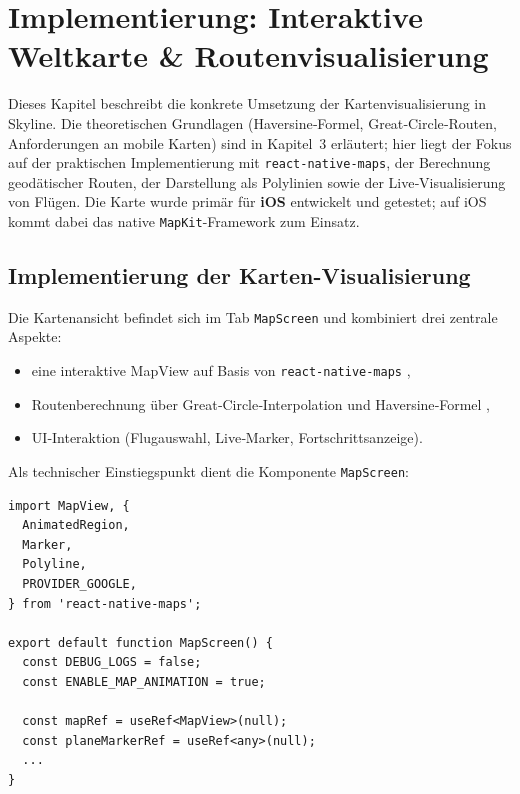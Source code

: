 \chapter{Implementierung: Interaktive Weltkarte \& Routenvisualisierung}\label{chapter:weltkarte}

Dieses Kapitel beschreibt die konkrete Umsetzung der Kartenvisualisierung in Skyline.
Die theoretischen Grundlagen (Haversine‑Formel, Great‑Circle‑Routen, Anforderungen an mobile Karten) sind in Kapitel~3 erläutert; hier liegt der Fokus auf der praktischen Implementierung mit \texttt{react-native-maps}, der Berechnung geodätischer Routen, der Darstellung als Polylinien sowie der Live‑Visualisierung von Flügen.
Die Karte wurde primär für \textbf{iOS} entwickelt und getestet; auf iOS kommt dabei das native \texttt{MapKit}-Framework zum Einsatz.

\section{Implementierung der Karten-Visualisierung}

Die Kartenansicht befindet sich im Tab \texttt{MapScreen} und kombiniert drei zentrale Aspekte:

\begin{itemize}
  \item eine interaktive MapView auf Basis von \texttt{react-native-maps} \cite{reactNativeMaps},
  \item Routenberechnung über Great‑Circle‑Interpolation und Haversine‑Formel \cite{movableTypeLatLong},
  \item UI‑Interaktion (Flugauswahl, Live‑Marker, Fortschrittsanzeige).
\end{itemize}

Als technischer Einstiegspunkt dient die Komponente \texttt{MapScreen}:

\begin{lstlisting}[style=skyline-ts,
  caption={Karten-Screen in Skyline (Ausschnitt aus \texttt{app/(tabs)/map.tsx})},
  label={lst:map_screen_entry}]
import MapView, {
  AnimatedRegion,
  Marker,
  Polyline,
  PROVIDER_GOOGLE,
} from 'react-native-maps';

export default function MapScreen() {
  const DEBUG_LOGS = false;
  const ENABLE_MAP_ANIMATION = true;

  const mapRef = useRef<MapView>(null);
  const planeMarkerRef = useRef<any>(null);
  ...
}
\end{lstlisting}

